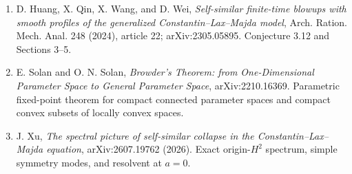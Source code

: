 \documentclass[11pt]{article}
\begin{document}
\begin{enumerate}
\item D. Huang, X. Qin, X. Wang, and D. Wei,
\emph{Self-similar finite-time blowups with smooth profiles of the generalized
Constantin--Lax--Majda model}, Arch. Ration. Mech. Anal. 248 (2024), article
22; arXiv:2305.05895.  Conjecture 3.12 and Sections 3--5.
\item E. Solan and O. N. Solan, \emph{Browder's Theorem: from
One-Dimensional Parameter Space to General Parameter Space},
arXiv:2210.16369.  Parametric fixed-point theorem for compact connected
parameter spaces and compact convex subsets of locally convex spaces.
\item J. Xu, \emph{The spectral picture of self-similar collapse in the
Constantin--Lax--Majda equation}, arXiv:2607.19762 (2026).  Exact
origin-$H^2$ spectrum, simple symmetry modes, and resolvent at $a=0$.
\end{enumerate}
\end{document}
